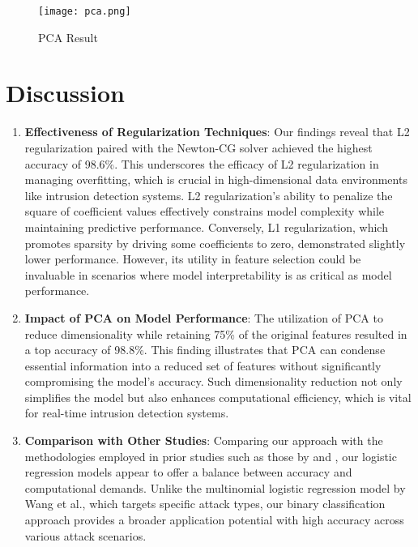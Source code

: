 \documentclass[a4paper,10pt,twocolumn]{article}
\begin{document}
\begin{figure}[h!t]
    \centering
    \texttt{[image: pca.png]}%
    \caption{PCA Result}
    \label{fig:pca}
\end{figure}

\section{Discussion}
\label{sec:discussion}

\begin{enumerate}
    \item \textbf{Effectiveness of Regularization Techniques}: 
    Our findings reveal that L2 regularization paired with the Newton-CG solver achieved the highest accuracy of 98.6\%. This underscores the efficacy of L2 regularization in managing overfitting, which is crucial in high-dimensional data environments like intrusion detection systems. L2 regularization's ability to penalize the square of coefficient values effectively constrains model complexity while maintaining predictive performance. Conversely, L1 regularization, which promotes sparsity by driving some coefficients to zero, demonstrated slightly lower performance. However, its utility in feature selection could be invaluable in scenarios where model interpretability is as critical as model performance.

    \item \textbf{Impact of PCA on Model Performance}:
    The utilization of PCA to reduce dimensionality while retaining 75\% of the original features resulted in a top accuracy of 98.8\%. This finding illustrates that PCA can condense essential information into a reduced set of features without significantly compromising the model’s accuracy. Such dimensionality reduction not only simplifies the model but also enhances computational efficiency, which is vital for real-time intrusion detection systems.

    \item \textbf{Comparison with Other Studies}:
    Comparing our approach with the methodologies employed in prior studies such as those by \cite{wang2005multinomial}  and \cite{gu2020effective}, our logistic regression models appear to offer a balance between accuracy and computational demands. Unlike the multinomial logistic regression model by Wang et al., which targets specific attack types, our binary classification approach provides a broader application potential with high accuracy across various attack scenarios.
\end{enumerate}
\end{document}
